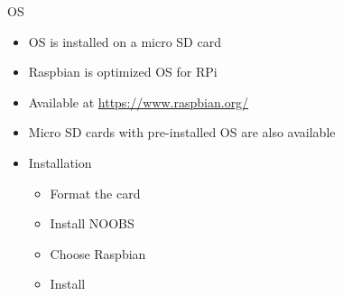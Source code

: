 \begin{frame}{OS}
	\begin{itemize}
		\item OS is installed on a micro SD card
		\item Raspbian is optimized OS for RPi
		\item Available at \url{https://www.raspbian.org/}
		\item Micro SD cards with pre-installed OS are also available
		\item Installation
		\begin{itemize}
			\item Format the card
			\item Install NOOBS
			\item Choose Raspbian
			\item Install
		\end{itemize} 
	\end{itemize}
\end{frame}